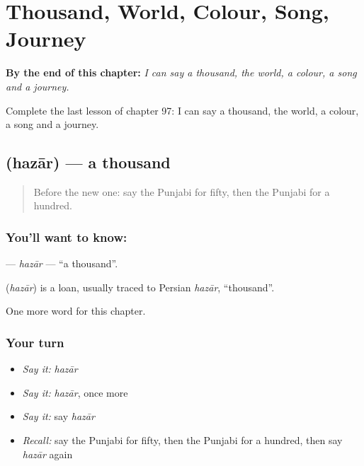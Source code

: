 
\chapter{Thousand, World, Colour, Song, Journey}
\label{ch:pa-thousand-world-colour-song-journey}

\begin{chapteropening}
\textbf{By the end of this chapter:} \emph{I can say a thousand, the world, a colour, a song and a journey.}

Complete the last lesson of chapter 97: I can say a thousand, the world, a colour, a song and a journey.
\end{chapteropening}

\section[\texorpdfstring{\pa{ਹਜ਼ਾਰ} (hazār)}{ਹਜ਼ਾਰ (hazār)}]{ (hazār) — a thousand}

\label{lesson:PA-C97-hazar}



\begin{quote}
Before the new one: say the Punjabi for fifty, then the Punjabi for a hundred.
\end{quote}

\subsection*{You'll want to know: }
\textbf{} — \emph{hazār} — \textquotedblleft{}a thousand\textquotedblright{}.

\begin{cousinweb}
\textbf{} (\emph{hazār}) is a loan, usually traced to Persian \emph{hazār}, \textquotedblleft{}thousand\textquotedblright{}.
\end{cousinweb}

\begin{grammarlens}[title={What you've built}]
One more word for this chapter.
\end{grammarlens}

\subsection*{Your turn}
\begin{itemize}
\raggedright
  \item \emph{Say it:} \emph{hazār}
  \item \emph{Say it:} \emph{hazār}, once more
  \item \emph{Say it:} say \emph{hazār}
  \item \emph{Recall:} say the Punjabi for fifty, then the Punjabi for a hundred, then say \emph{hazār} again
\end{itemize}

